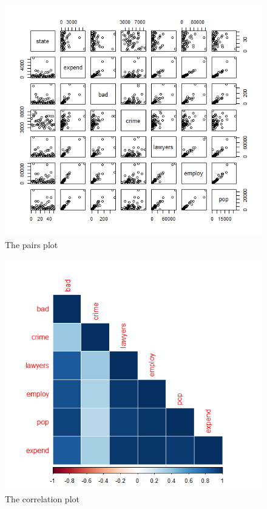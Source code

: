 \documentclass{article}
\begin{document}
    \begin{figure}[H]
        \centering
        \includegraphics[scale=0.4]{../results/4_pairs.png}
        \caption{The pairs plot}
        \label{fig:PairsCrime}
    \end{figure} 

    \begin{figure}
        \centering
        \includegraphics[scale=0.4]{../results/4_lower_corrplot.png}
        \caption{The correlation plot}
        \label{fig:cormatrix}
    \end{figure} 
\end{document}
